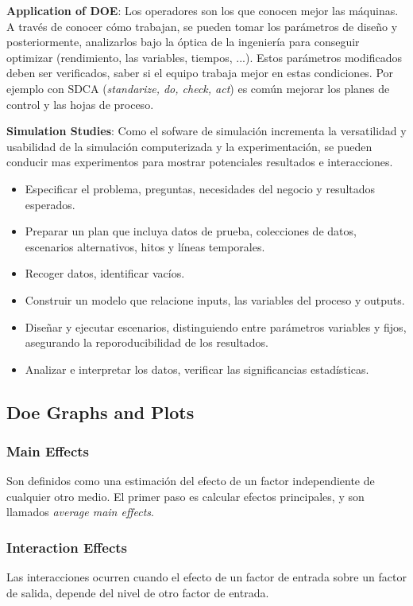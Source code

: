 \documentclass[]{article}
\begin{document}
\textbf{Application of DOE}: Los operadores son los que conocen mejor las máquinas. A través de conocer cómo trabajan, se pueden tomar los parámetros de diseño y posteriormente, analizarlos bajo la óptica de la ingeniería para conseguir optimizar (rendimiento, las variables, tiempos, ...). Estos parámetros modificados deben ser verificados, saber si el equipo trabaja mejor en estas condiciones. Por ejemplo con SDCA (\textit{standarize, do, check, act}) es común mejorar los planes de control y las hojas de proceso.

\textbf{Simulation Studies}: Como el sofware de simulación incrementa la versatilidad y usabilidad de la simulación computerizada y la experimentación, se pueden conducir mas experimentos para mostrar potenciales resultados e interacciones. 

\begin{itemize}
	\item Especificar el problema, preguntas, necesidades del negocio y resultados esperados.
	\item Preparar un plan que incluya datos de prueba, colecciones de datos, escenarios alternativos, hitos y líneas temporales.
	\item Recoger datos, identificar vacíos.
	\item Construir un modelo que relacione inputs, las variables del proceso y outputs.
	\item Diseñar y ejecutar escenarios, distinguiendo entre parámetros variables y fijos, asegurando la reporoducibilidad de los resultados.
	\item Analizar e interpretar los datos, verificar las significancias estadísticas.
\end{itemize}

\subsection{Doe Graphs and Plots}
\subsubsection{Main Effects}
Son definidos como una estimación del efecto de un factor independiente de cualquier otro medio. El primer paso es calcular efectos principales, y son llamados \textit{average main effects}.

\subsubsection{Interaction Effects}
Las interacciones ocurren cuando el efecto de un factor de entrada sobre un factor de salida, depende del nivel de otro factor de entrada.
\end{document}
